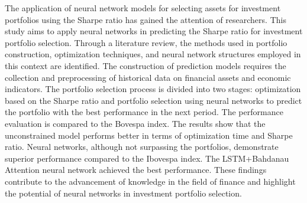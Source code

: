 The application of neural network models for selecting assets for investment portfolios using the Sharpe ratio has gained the attention of researchers. This study aims to apply neural networks in predicting the Sharpe ratio for investment portfolio selection. Through a literature review, the methods used in portfolio construction, optimization techniques, and neural network structures employed in this context are identified. The construction of prediction models requires the collection and preprocessing of historical data on financial assets and economic indicators. The portfolio selection process is divided into two stages: optimization based on the Sharpe ratio and portfolio selection using neural networks to predict the portfolio with the best performance in the next period. The performance evaluation is compared to the Bovespa index. The results show that the unconstrained model performs better in terms of optimization time and Sharpe ratio. Neural networks, although not surpassing the portfolios, demonstrate superior performance compared to the Ibovespa index. The LSTM+Bahdanau Attention neural network achieved the best performance. These findings contribute to the advancement of knowledge in the field of finance and highlight the potential of neural networks in investment portfolio selection.